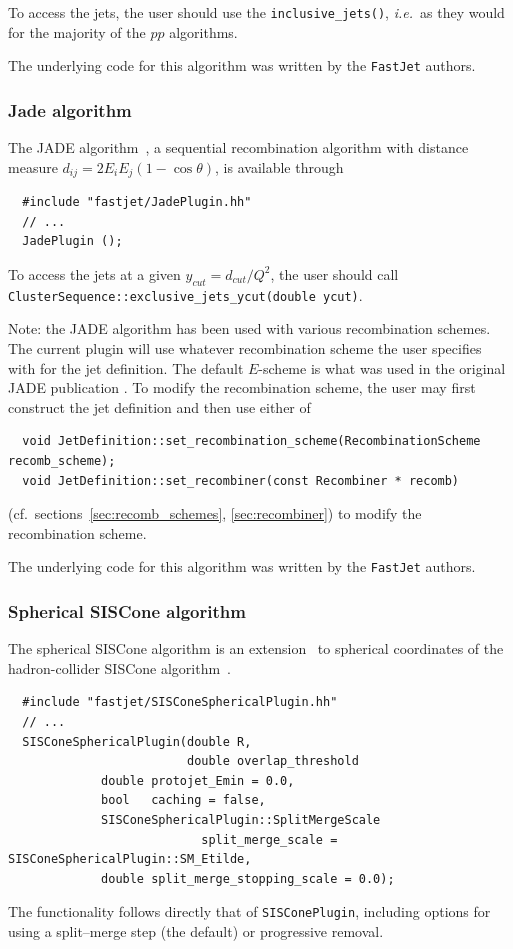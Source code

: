 \documentclass[12pt,a4]{article}
\newcommand{\fastjet}{\texttt{FastJet}\xspace}
\newcommand{\ttt}[1]{{\small\texttt{#1}}}
\newcommand{\ie}{{\it i.e.}\ }
\begin{document}
To access the jets, the user should use the \verb|inclusive_jets()|,
\ie as they would for the majority of the $pp$ algorithms.

The underlying code for this algorithm was written by the \fastjet
authors.

\subsubsection{Jade algorithm}
\label{sec:ee-jade}
The JADE algorithm~\cite{Bartel:1986ua,Bethke:1988zc}, a sequential
recombination algorithm with distance measure $d_{ij} = 2E_i E_j
(1-\cos\theta)$, is available through
\begin{lstlisting}
  #include "fastjet/JadePlugin.hh"
  // ...
  JadePlugin ();
\end{lstlisting}
To access the jets at a given $y_{cut} = d_{cut}/Q^2$, the user 
should call \ttt{ClusterSequence::exclusive\_jets\_ycut(double ycut)}.

Note: the JADE algorithm has been used with various recombination
schemes. The current plugin will use whatever recombination scheme the
user specifies with for the jet definition. The default $E$-scheme is
what was used in the original JADE publication \cite{Bartel:1986ua}.
%
To modify the recombination scheme, the user may first construct the
jet definition and then use either of 
\begin{lstlisting}
  void JetDefinition::set_recombination_scheme(RecombinationScheme recomb_scheme);
  void JetDefinition::set_recombiner(const Recombiner * recomb)
\end{lstlisting}
(cf.~sections~\ref{sec:recomb_schemes}, \ref{sec:recombiner}) to modify the
recombination scheme.

The underlying code for this algorithm was written by the \fastjet
authors.

\subsubsection{Spherical SISCone algorithm}
\label{sec:spherical-siscone}

The spherical SISCone algorithm is an extension~\cite{SpheriSISCone}
to spherical coordinates of the hadron-collider SISCone
algorithm~\cite{SISCone}.
\begin{lstlisting}
  #include "fastjet/SISConeSphericalPlugin.hh"
  // ...
  SISConeSphericalPlugin(double R, 
                         double overlap_threshold
			 double protojet_Emin = 0.0, 
			 bool   caching = false,
			 SISConeSphericalPlugin::SplitMergeScale  
                           split_merge_scale = SISConeSphericalPlugin::SM_Etilde,
			 double split_merge_stopping_scale = 0.0);
\end{lstlisting}
The functionality follows directly that of \ttt{SISConePlugin},
including options for using a split--merge step (the default) or
progressive removal.
\end{document}
